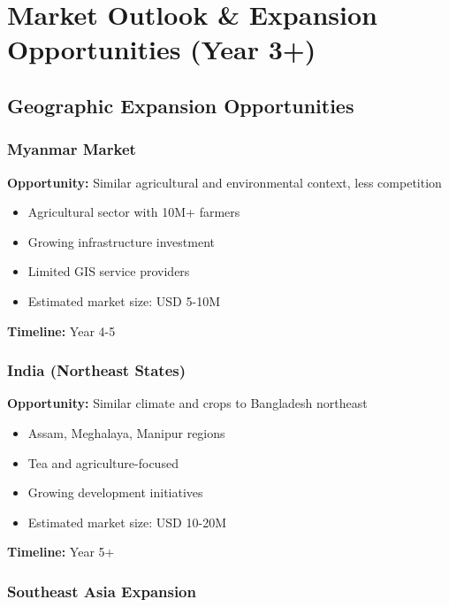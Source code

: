 
\chapter{Market Outlook \& Expansion Opportunities (Year 3+)}

\section{Geographic Expansion Opportunities}

\subsection{Myanmar Market}

\textbf{Opportunity:} Similar agricultural and environmental context, less competition

\begin{itemize}
    \item Agricultural sector with 10M+ farmers
    \item Growing infrastructure investment
    \item Limited GIS service providers
    \item Estimated market size: USD 5-10M
\end{itemize}

\textbf{Timeline:} Year 4-5

\subsection{India (Northeast States)}

\textbf{Opportunity:} Similar climate and crops to Bangladesh northeast

\begin{itemize}
    \item Assam, Meghalaya, Manipur regions
    \item Tea and agriculture-focused
    \item Growing development initiatives
    \item Estimated market size: USD 10-20M
\end{itemize}

\textbf{Timeline:} Year 5+

\subsection{Southeast Asia Expansion}

